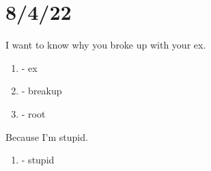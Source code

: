 \documentclass{article}
\begin{document}
\section*{8/4/22}

I want to know why you broke up with your ex.

\begin{enumerate}
    \item {} - ex
        \item {} - breakup
    \item {} - root
\end{enumerate}


Because I'm stupid.

\begin{enumerate}
    \item {} - stupid
\end{enumerate}
\end{document}
